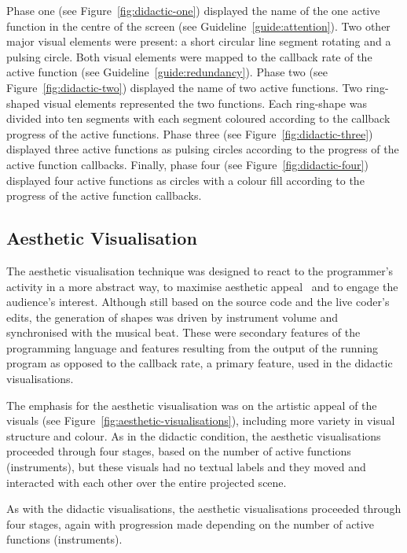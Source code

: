 Phase one (see Figure~\ref{fig:didactic-one}) displayed the name of the one active function in the centre of the screen (see Guideline~\ref{guide:attention}). Two other major visual elements were present: a short circular line segment rotating and a pulsing circle. Both visual elements were mapped to the callback rate of the active function (see Guideline~\ref{guide:redundancy}). Phase two (see Figure~\ref{fig:didactic-two}) displayed the name of two active functions. Two ring-shaped visual elements represented the two functions. Each ring-shape was divided into ten segments with each segment coloured according to the callback progress of the active functions. Phase three (see Figure~\ref{fig:didactic-three}) displayed three active functions as pulsing circles according to the progress of the active function callbacks. Finally, phase four (see Figure~\ref{fig:didactic-four}) displayed four active functions as circles with a colour fill according to the progress of the active function callbacks.



\subsection{Aesthetic Visualisation}
\label{sec:aesthetic-visualisation}

The aesthetic visualisation technique was designed to react to the programmer's activity in a more abstract way, to maximise aesthetic appeal~\cite{Cawthon2007} and to engage the audience's interest. Although still based on the source code and the live coder's edits, the generation of shapes was driven by instrument volume and synchronised with the musical beat. These were secondary features of the programming language and features resulting from the output of the running program as opposed to the callback rate, a primary feature, used in the didactic visualisations.

The emphasis for the aesthetic visualisation was on the artistic appeal of the visuals (see Figure~\ref{fig:aesthetic-visualisations}), including more variety in visual structure and colour. As in the didactic condition, the aesthetic visualisations proceeded through four stages, based on the number of active functions (instruments), but these visuals had no textual labels and they moved and interacted with each other over the entire projected scene.

As with the didactic visualisations, the aesthetic visualisations proceeded through four stages, again with progression made depending on the number of active functions (instruments).

